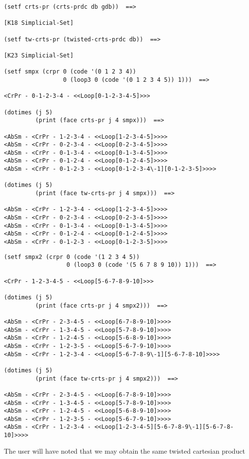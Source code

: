 {\footnotesize\begin{verbatim}
(setf crts-pr (crts-prdc db gdb))  ==>

[K18 Simplicial-Set]

(setf tw-crts-pr (twisted-crts-prdc db))  ==>

[K23 Simplicial-Set]

(setf smpx (crpr 0 (code '(0 1 2 3 4))
                 0 (loop3 0 (code '(0 1 2 3 4 5)) 1)))  ==>

<CrPr - 0-1-2-3-4 - <<Loop[0-1-2-3-4-5]>>>

(dotimes (j 5)
         (print (face crts-pr j 4 smpx)))  ==>

<AbSm - <CrPr - 1-2-3-4 - <<Loop[1-2-3-4-5]>>>>
<AbSm - <CrPr - 0-2-3-4 - <<Loop[0-2-3-4-5]>>>>
<AbSm - <CrPr - 0-1-3-4 - <<Loop[0-1-3-4-5]>>>>
<AbSm - <CrPr - 0-1-2-4 - <<Loop[0-1-2-4-5]>>>>
<AbSm - <CrPr - 0-1-2-3 - <<Loop[0-1-2-3-4\-1][0-1-2-3-5]>>>>

(dotimes (j 5)
         (print (face tw-crts-pr j 4 smpx)))  ==>

<AbSm - <CrPr - 1-2-3-4 - <<Loop[1-2-3-4-5]>>>>
<AbSm - <CrPr - 0-2-3-4 - <<Loop[0-2-3-4-5]>>>>
<AbSm - <CrPr - 0-1-3-4 - <<Loop[0-1-3-4-5]>>>>
<AbSm - <CrPr - 0-1-2-4 - <<Loop[0-1-2-4-5]>>>>
<AbSm - <CrPr - 0-1-2-3 - <<Loop[0-1-2-3-5]>>>>
\end{verbatim}}
\newpage
{\footnotesize\begin{verbatim}
(setf smpx2 (crpr 0 (code '(1 2 3 4 5))
                  0 (loop3 0 (code '(5 6 7 8 9 10)) 1)))  ==>

<CrPr - 1-2-3-4-5 - <<Loop[5-6-7-8-9-10]>>>

(dotimes (j 5)
         (print (face crts-pr j 4 smpx2)))  ==>

<AbSm - <CrPr - 2-3-4-5 - <<Loop[6-7-8-9-10]>>>>
<AbSm - <CrPr - 1-3-4-5 - <<Loop[5-7-8-9-10]>>>>
<AbSm - <CrPr - 1-2-4-5 - <<Loop[5-6-8-9-10]>>>>
<AbSm - <CrPr - 1-2-3-5 - <<Loop[5-6-7-9-10]>>>>
<AbSm - <CrPr - 1-2-3-4 - <<Loop[5-6-7-8-9\-1][5-6-7-8-10]>>>>

(dotimes (j 5)
         (print (face tw-crts-pr j 4 smpx2)))  ==>

<AbSm - <CrPr - 2-3-4-5 - <<Loop[6-7-8-9-10]>>>>
<AbSm - <CrPr - 1-3-4-5 - <<Loop[5-7-8-9-10]>>>>
<AbSm - <CrPr - 1-2-4-5 - <<Loop[5-6-8-9-10]>>>>
<AbSm - <CrPr - 1-2-3-5 - <<Loop[5-6-7-9-10]>>>>
<AbSm - <CrPr - 1-2-3-4 - <<Loop[1-2-3-4-5][5-6-7-8-9\-1][5-6-7-8-10]>>>>
\end{verbatim}}
The user will have noted that we may obtain the same twisted cartesian product
